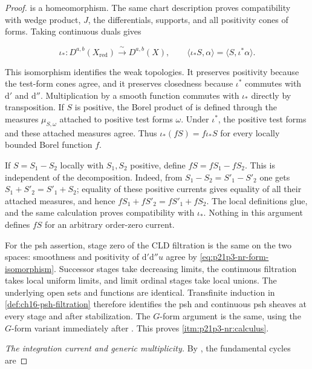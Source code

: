 \begin{proof}
is a homeomorphism.  The same chart description proves compatibility with
wedge product, \(J\), the differentials, supports, and all positivity cones
of forms.  Taking continuous duals gives

\begin{equation}
\label{eq:p21p3-nr-current-isomorphism}
 \iota_*:D^{a,b}(X_{\mathrm{red}})
              \xrightarrow{\ \sim\ }D^{a,b}(X),
 \qquad
 \langle\iota_*S,\alpha\rangle
       =\langle S,\iota^*\alpha\rangle .
\end{equation}

This isomorphism identifies the weak topologies.  It preserves positivity
because the test-form cones agree, and it preserves closedness because
\(\iota^*\) commutes with \(\mathrm d'\) and \(\mathrm d''\).
Multiplication by a smooth function commutes with \(\iota_*\) directly by
transposition.  If \(S\) is positive, the Borel product of
\cite[Example~7.2.12]{CLD25} is defined through the measures
\(\mu_{S,\omega}\) attached to positive test forms \(\omega\).  Under
\(\iota^*\), the positive test forms and these attached measures agree.
Thus \(\iota_*(fS)=f\iota_*S\) for every locally bounded Borel function
\(f\).

If \(S=S_1-S_2\) locally with \(S_1,S_2\) positive, define
\(fS=fS_1-fS_2\).  This is independent of the decomposition.  Indeed, from
\(S_1-S_2=S'_1-S'_2\) one gets
\(S_1+S'_2=S'_1+S_2\); equality of these positive currents gives equality
of all their attached measures, and hence
\(fS_1+fS'_2=fS'_1+fS_2\).  The local definitions glue, and the same
calculation proves compatibility with \(\iota_*\).  Nothing in this
argument defines \(fS\) for an arbitrary order-zero current.

For the psh assertion, stage zero of the CLD filtration is the same on the
two spaces: smoothness and positivity of
\(\mathrm d'\mathrm d''u\) agree by
\eqref{eq:p21p3-nr-form-isomorphism}.  Successor stages take decreasing
limits, the continuous filtration takes local uniform limits, and limit
ordinal stages take local unions.  The underlying open sets and functions
are identical.  Transfinite induction in
\cref{def:ch16-psh-filtration} therefore identifies the psh and continuous
psh sheaves at every stage and after stabilization.  The \(G\)-form
argument is the same, using the \(G\)-form variant immediately after
\cite[Proposition~15.1.3]{CLD25}.  This proves
\cref{itm:p21p3-nr:calculus}.

\smallskip
\emph{The integration current and generic multiplicity.}
By \cite[Definition~13.2.5 and \S13.5.2]{CLD25}, the fundamental cycles
are


\end{proof}

